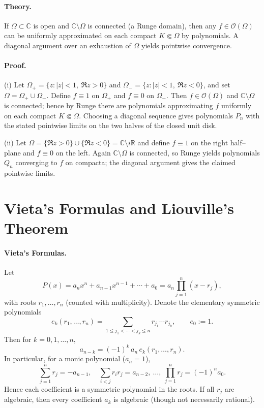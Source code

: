 \documentclass[12pt,a4paper]{article}
\theoremstyle{plain}
\theoremstyle{definition}
\theoremstyle{remark}
\theoremstyle{remark}
\begin{document}
\paragraph{Theory.}
If $\Omega\subset\mathbb C$ is open and $\mathbb C\setminus\Omega$ is connected (a Runge domain),
then any $f\in\mathcal O(\Omega)$ can be uniformly approximated on each compact $K\Subset\Omega$
by polynomials. A diagonal argument over an exhaustion of $\Omega$ yields pointwise convergence.

\paragraph{Proof.}
(i) Let $\Omega_+=\{z:|z|<1,\ \Re z>0\}$ and $\Omega_-=\{z:|z|<1,\ \Re z<0\}$, and set $\Omega=\Omega_+\cup\Omega_-$. Define $f\equiv1$ on $\Omega_+$ and $f\equiv0$ on $\Omega_-$. Then $f\in\mathcal O(\Omega)$ and $\mathbb C\setminus\Omega$ is connected; hence by Runge there are polynomials approximating $f$ uniformly on each compact $K\Subset\Omega$. Choosing a diagonal sequence gives polynomials $P_n$ with the stated pointwise limits on the two halves of the closed unit disk.

(ii) Let $\Omega=\{ \Re z>0\}\cup\{ \Re z<0\}=\mathbb C\setminus i\mathbb R$ and define $f\equiv1$ on the right half–plane and $f\equiv0$ on the left. Again $\mathbb C\setminus\Omega$ is connected, so Runge yields polynomials $Q_n$ converging to $f$ on compacta; the diagonal argument gives the claimed pointwise limits.

\section*{Vieta's Formulas and Liouville's Theorem}

\paragraph{Vieta's Formulas.}
Let
\[
P(x)=a_n x^n+a_{n-1}x^{n-1}+\cdots+a_0
=a_n\prod_{j=1}^n (x-r_j),
\]
with roots $r_1,\dots,r_n$ (counted with multiplicity). Denote the elementary symmetric
polynomials
\[
e_k(r_1,\dots,r_n)=\sum_{1\le j_1<\cdots<j_k\le n} r_{j_1}\cdots r_{j_k},
\qquad e_0:=1.
\]
Then for $k=0,1,\dots,n$,
\[
a_{n-k}=(-1)^k\,a_n\, e_k(r_1,\dots,r_n).
\]
In particular, for a monic polynomial ($a_n=1$),
\[
\sum_{j=1}^n r_j=-a_{n-1},\quad
\sum_{i<j} r_ir_j=a_{n-2},\ \ldots,\ 
\prod_{j=1}^n r_j=(-1)^n a_0.
\]
Hence each coefficient is a symmetric polynomial in the roots. If all $r_j$ are algebraic,
then every coefficient $a_k$ is algebraic (though not necessarily rational).
\end{document}
